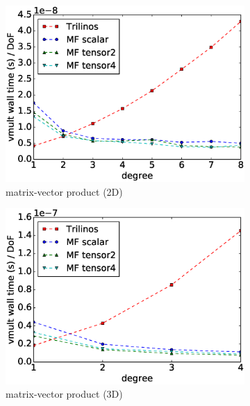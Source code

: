 \documentclass[preprint,12pt,times]{elsarticle}
\begin{document}
\begin{figure}[!ht]
  \centering
  \begin{subfigure}[b]{0.49\textwidth}
      \centering
      \includegraphics[width=\textwidth]{IWR_timing2d.eps}
      \caption{matrix-vector product (2D)}
      \label{fig:benchmark_miehe_IWR_vmult2}
  \end{subfigure}
  \begin{subfigure}[b]{0.49\textwidth}
    \centering
    \includegraphics[width=\textwidth]{IWR_timing3d.eps}
    \caption{matrix-vector product (3D)}
    \label{fig:benchmark_miehe_IWR_vmult3}
  \end{subfigure}
  ~
  \begin{subfigure}[b]{0.49\textwidth}
      \centering

\end{subfigure}
\end{figure}
\end{document}
